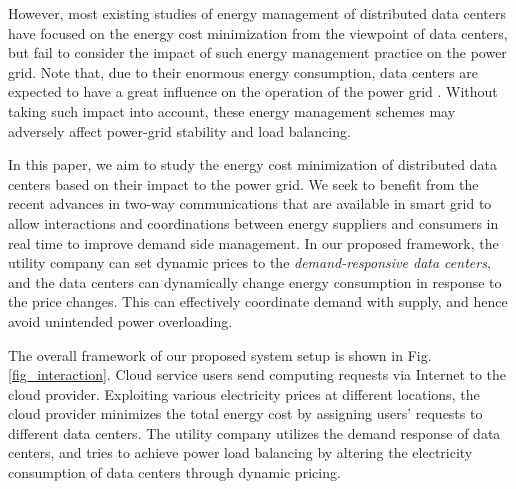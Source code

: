 \documentclass[journal]{IEEEtran}
\begin{document}
	However, most existing studies of energy management of distributed data centers have focused on the energy cost minimization from the viewpoint of data centers, but fail to consider the impact of such energy management practice on the power grid. Note that, due to their enormous energy consumption, data centers are expected to have a great influence on the operation of the power grid \cite{coordinate}. Without taking such impact into account, these energy management schemes may adversely affect power-grid stability and load balancing.
	
	In this paper, we aim to study the energy cost minimization of distributed data centers based on their impact to the power grid. We seek to benefit from the recent advances in two-way communications that are available in smart grid \cite{smartgrid} to allow interactions and coordinations between energy suppliers and consumers in real time to improve demand side management. In our proposed framework, the utility company can set dynamic prices to the \emph{demand-responsive data centers}, and the data centers can dynamically change energy consumption in response to the price changes. This can effectively coordinate demand with supply, and hence avoid unintended power overloading.
	
	The overall framework of our proposed system setup is shown in Fig. \ref{fig_interaction}. Cloud service users send computing requests via Internet to the cloud provider. Exploiting various electricity prices at different locations, the cloud provider minimizes the total energy cost by assigning users' requests to different data centers. The utility company utilizes the demand response of data centers, and tries to achieve power load balancing by altering the electricity consumption of data centers through dynamic pricing.
		
\end{document}
